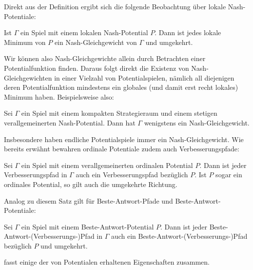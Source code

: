 Direkt aus der Definition ergibt sich die folgende Beobachtung über lokale Nash-Potentiale:

\begin{beob}\label{beob:lokMinNG}
	Ist $\Gamma$ ein Spiel mit einem lokalen Nash-Potential $P$. Dann ist jedes lokale Minimum von $P$ ein Nash-Gleichgewicht von $\Gamma$ und umgekehrt.
\end{beob}

Wir können also Nash-Gleichgewichte allein durch Betrachten einer Potentialfunktion finden. Daraus folgt direkt die Existenz von Nash-Gleichgewichten in einer Vielzahl von Potentialspielen, nämlich all diejenigen deren Potentialfunktion mindestens ein globales (und damit erst recht lokales) Minimum haben. Beispielsweise also:

\begin{kor}
	Sei $\Gamma$ ein Spiel mit einem kompakten Strategieraum und einem stetigen verallgemeinerten Nash-Potential. Dann hat $\Gamma$ wenigstens ein Nash-Gleichgewicht.
\end{kor}

Insbesondere haben endliche Potentialspiele immer ein Nash-Gleichgewicht. Wie bereits erwähnt bewahren ordinale Potentiale zudem auch Verbesserungspfade:

\begin{satz}\label{prop:ordPotVerbpfad}
	Sei $\Gamma$ ein Spiel mit einem verallgemeinerten ordinalen Potential $P$. Dann ist jeder Verbesserungspfad in $\Gamma$ auch ein Verbesserungspfad bezüglich $P$. Ist $P$ sogar ein ordinales Potential, so gilt auch die umgekehrte Richtung.
\end{satz}

Analog zu diesem Satz gilt für Beste-Antwort-Pfade und Beste-Antwort-Potentiale:

\begin{satz}\label{prop:BAPotBAPfad}
	Sei $\Gamma$ ein Spiel mit einem Beste-Antwort-Potential $P$. Dann ist jeder Beste-Antwort-(Verbesserungs-)Pfad in $\Gamma$ auch ein Beste-Antwort-(Verbesserungs-)Pfad bezüglich $P$ und umgekehrt.
\end{satz}

 fasst einige der von Potentialen erhaltenen Eigenschaften zusammen.

